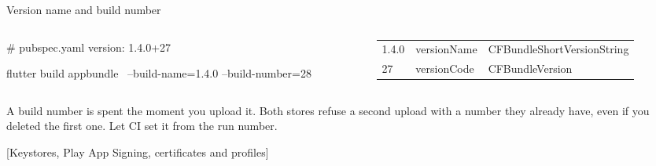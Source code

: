 \documentclass[10pt,aspectratio=169,t]{beamer}
\begin{document}
\begin{frame}[fragile,eyebrow=Building]{Version name and build number}
  \begin{columns}[T]
    \begin{column}{0.44\textwidth}
\begin{yaml}
# pubspec.yaml
version: 1.4.0+27
\end{yaml}
\begin{shell}
flutter build appbundle \
  --build-name=1.4.0 --build-number=28
\end{shell}
    \end{column}
    \begin{column}{0.52\textwidth}
      {\begin{tabular}{@{}lll@{}}
        \toprule
        \thead{Part} & \thead{Android} & \thead{iOS} \\
        \midrule
        1.4.0 & versionName & CFBundleShortVersionString \\
        27 & versionCode & CFBundleVersion \\
        \bottomrule
      \end{tabular}}
      \vskip 3mm
    \end{column}
  \end{columns}
  \begin{takeaway}{A build number is spent the moment you upload it.}
    Both stores refuse a second upload with a number they already have, even if you deleted the first one. Let CI set it from the run number.
  \end{takeaway}
\end{frame}

[Keystores, Play App Signing, certificates and profiles]
\end{document}
